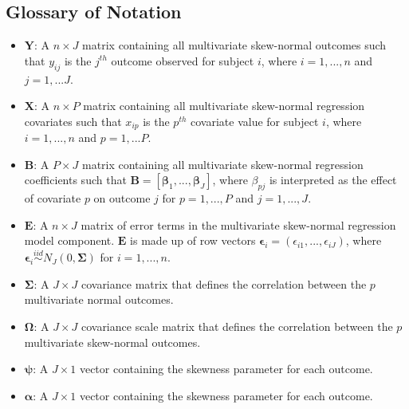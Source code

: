 \documentclass[useAMS,referee]{biom}
\begin{document}
\newpage

\subsection{Glossary of Notation}

\begin{itemize}

    \item $\mathbf{Y}$: A $n \times J$ matrix containing all multivariate skew-normal  outcomes such that $y_{ij}$ is the $j^{th}$ outcome observed for subject $i$, where $i = 1,...,n$ and $j = 1,...J$.
    
    \item $\mathbf{X}$: A $n \times P$ matrix containing all multivariate skew-normal regression covariates such that $x_{ip}$ is the $p^{th}$ covariate value for subject $i$, where $i = 1,...,n$ and $p = 1,...P$.
    
    \item $\mathbf{B}$: A $P \times J$ matrix containing all multivariate skew-normal regression coefficients such that $\mathbf{B} = \left [ \boldsymbol\beta_1,...,\boldsymbol\beta_J \right ]$, where $\beta_{pj}$ is interpreted as the effect of covariate $p$ on outcome $j$ for $p = 1,...,P$ and $j = 1,...,J$.
    
    \item $\mathbf{E}$: A $n \times J$ matrix of error terms in the multivariate skew-normal regression model component. $\mathbf{E}$ is made up of row vectors $\boldsymbol\epsilon_i = (\epsilon_{i1},...,\epsilon_{iJ})$, where $ \boldsymbol\epsilon_i \stackrel{iid}{\sim} N_J(0, \boldsymbol\Sigma)$ for $i = 1,...,n$.
    
    \item $\boldsymbol\Sigma$: A $J \times J$ covariance matrix that defines the correlation between the $p$ multivariate normal outcomes. 
    
    \item $\boldsymbol\Omega$: A $J \times J$ covariance scale matrix that defines the correlation between the $p$ multivariate skew-normal outcomes. 
    
    \item $\boldsymbol\psi$: A $J \times 1$ vector containing the skewness parameter for each outcome.
    
    \item $\boldsymbol\alpha$: A $J \times 1$ vector containing the skewness parameter for each outcome.
    

\end{itemize}
\end{document}
